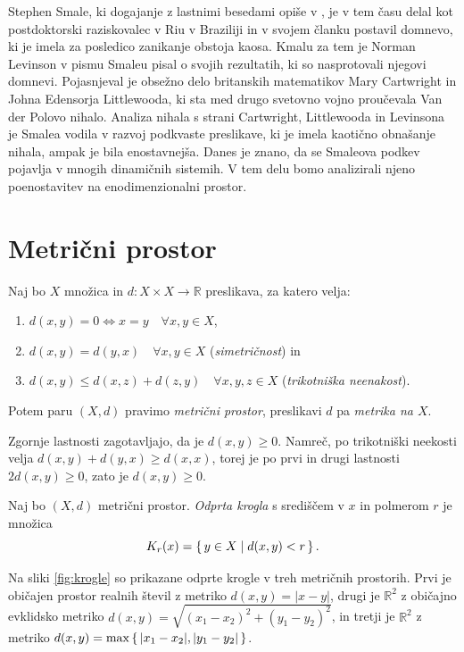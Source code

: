 \documentclass{isrmdelo}
\newcommand{\R}{\mathbb R}
\begin{document}
Stephen Smale, ki dogajanje z lastnimi besedami opiše v \cite{smale98}, je v tem času delal kot postdoktorski raziskovalec v Riu v Braziliji in v svojem članku postavil domnevo, ki je imela za posledico zanikanje obstoja kaosa. Kmalu za tem je Norman Levinson v pismu Smaleu pisal o svojih rezultatih, ki so nasprotovali njegovi domnevi. Pojasnjeval je obsežno delo britanskih matematikov Mary Cartwright in Johna Edensorja Littlewooda, ki sta med drugo svetovno vojno proučevala Van der Polovo nihalo. Analiza nihala s strani Cartwright, Littlewooda in Levinsona je Smalea vodila v razvoj podkvaste preslikave, ki je imela kaotično obnašanje nihala, ampak je bila enostavnejša. Danes je znano, da se Smaleova podkev pojavlja v mnogih dinamičnih sistemih. V tem delu bomo analizirali njeno poenostavitev na enodimenzionalni prostor.

\section{Metrični prostor}

\begin{definicija}
Naj bo $X$ množica in $d: X \times X \rightarrow \R$ preslikava, za katero velja:
\begin{enumerate}
\item $d(x,y) = 0 \iff x = y \quad \forall x,y \in X$,
\item $d(x,y) = d(y,x) \quad \forall x,y \in X$ (\emph{simetričnost}) in
\item $d(x,y) \leq d(x,z) + d(z,y) \quad \forall x,y,z \in X$ (\emph{trikotniška neenakost}).
\end{enumerate}
Potem paru $(X, d)$ pravimo \emph{metrični prostor}, preslikavi $d$ pa \emph{metrika na $X$}.
\end{definicija}

\medskip

Zgornje lastnosti zagotavljajo, da je $d(x,y) \geq 0$. Namreč, po trikotniški neekosti velja $d(x,y) + d(y,x) \geq d(x,x)$, torej je po prvi in drugi lastnosti $2d(x,y) \geq 0$, zato je $d(x,y) \geq 0$.

\bigskip

\begin{definicija}
Naj bo $(X,d)$ metrični prostor. \emph{Odprta krogla} s središčem v $x$ in polmerom $r$ je množica $$K_r(x) = \set{ y \in X \mid d(x,y) < r }.$$
\end{definicija}

Na sliki \ref{fig:krogle} so prikazane odprte krogle v treh metričnih prostorih. Prvi je običajen prostor realnih števil z metriko $d(x,y) = \vert x-y \vert$, drugi je $\R^2$ z običajno evklidsko metriko $d(x,y) = \sqrt{(x_1-x_2)^2 + (y_1-y_2)^2}$, in tretji je $\R^2$ z metriko $d(x,y) = \max \set{ \vert x_1-x_2 \vert, \vert y_1-y_2 \vert }$.
\end{document}
